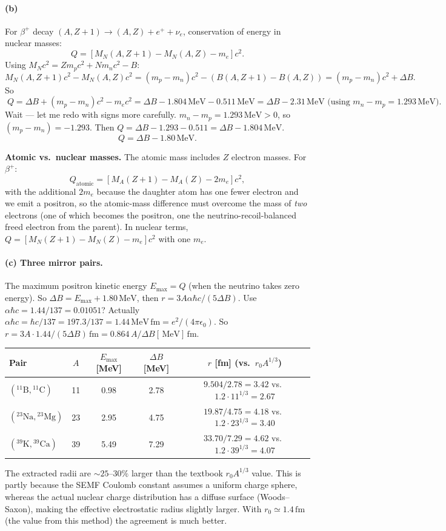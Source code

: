 \documentclass[11pt]{article}
\newcommand{\fm}{\,\mathrm{fm}}
\newcommand{\MeV}{\,\mathrm{MeV}}
\begin{document}
\paragraph{(b)} For $\beta^+$ decay $(A,Z+1)\to(A,Z)+e^{+}+\nu_e$, conservation of energy in nuclear masses:
\[
Q=[M_N(A,Z+1)-M_N(A,Z)-m_e]c^{2}.
\]
Using $M_N c^{2}=Z m_p c^{2}+N m_n c^{2}-B$:
\[
M_N(A,Z+1)c^{2}-M_N(A,Z)c^{2}=(m_p-m_n)c^{2}-(B(A,Z+1)-B(A,Z))=(m_p-m_n)c^{2}+\Delta B.
\]
So
\[
\boxed{\;Q=\Delta B+(m_p-m_n)c^{2}-m_e c^{2}=\Delta B-1.804\MeV-0.511\MeV=\Delta B-2.31\MeV \text{ (using }m_n-m_p=1.293\MeV).\;}
\]
Wait --- let me redo with signs more carefully. $m_n-m_p=1.293\MeV>0$, so $(m_p-m_n)=-1.293$. Then $Q=\Delta B-1.293-0.511=\Delta B-1.804\MeV$.
\[
\boxed{\;Q=\Delta B - 1.80\MeV.\;}
\]

\textbf{Atomic vs.\ nuclear masses.} The atomic mass includes $Z$ electron masses. For $\beta^+$:
\[
Q_\mathrm{atomic}=[M_A(Z+1)-M_A(Z)-2m_e]c^{2},
\]
with the additional $2m_e$ because the daughter atom has one fewer electron and we emit a positron, so the atomic-mass difference must overcome the mass of \emph{two} electrons (one of which becomes the positron, one the neutrino-recoil-balanced freed electron from the parent). In nuclear terms, $Q=[M_N(Z+1)-M_N(Z)-m_e]c^{2}$ with one $m_e$.

\paragraph{(c) Three mirror pairs.} The maximum positron kinetic energy $E_\mathrm{max}=Q$ (when the neutrino takes zero energy). So $\Delta B=E_\mathrm{max}+1.80\MeV$, then $r=3 A\alpha\hbar c/(5\Delta B)$. Use $\alpha\hbar c=1.44/137=0.01051$? Actually $\alpha\hbar c=\hbar c/137=197.3/137=1.44\MeV\fm=e^{2}/(4\pi\epsilon_{0})$. So $r=3 A\cdot 1.44/(5\Delta B)\fm=0.864\,A/\Delta B[\MeV]\fm$.

\begin{center}
\begin{tabular}{@{}lcccc@{}}\hline
Pair & $A$ & $E_\mathrm{max}$ [MeV] & $\Delta B$ [MeV] & $r$ [fm] (vs.\ $r_0 A^{1/3}$)\\\hline
$(^{11}\mathrm{B},{}^{11}\mathrm{C})$ & 11 & 0.98 & 2.78 & $9.504/2.78=3.42$ vs.\ $1.2\cdot 11^{1/3}=2.67$\\
$(^{23}\mathrm{Na},{}^{23}\mathrm{Mg})$ & 23 & 2.95 & 4.75 & $19.87/4.75=4.18$ vs.\ $1.2\cdot 23^{1/3}=3.40$\\
$(^{39}\mathrm{K},{}^{39}\mathrm{Ca})$ & 39 & 5.49 & 7.29 & $33.70/7.29=4.62$ vs.\ $1.2\cdot 39^{1/3}=4.07$\\\hline
\end{tabular}
\end{center}
The extracted radii are $\sim 25$--$30\%$ larger than the textbook $r_0 A^{1/3}$ value. This is partly because the SEMF Coulomb constant assumes a uniform charge sphere, whereas the actual nuclear charge distribution has a diffuse surface (Woods--Saxon), making the effective electrostatic radius slightly larger. With $r_0\simeq 1.4\fm$ (the value from this method) the agreement is much better.
\end{document}
